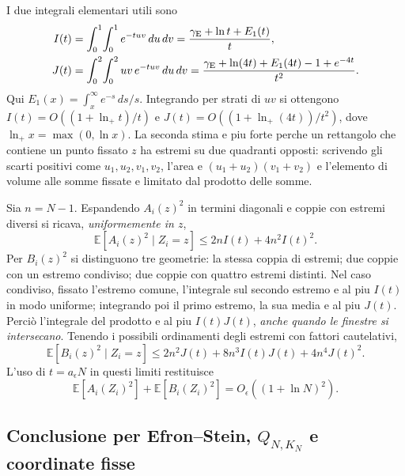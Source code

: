 \documentclass[11pt,a4paper]{article}
\begin{document}
I due integrali elementari utili sono
\begin{align}
 I(t)&=\int_0^1\!\int_0^1e^{-tuv}\,du\,dv
 =\frac{\gamma_{\rm E}+\ln t+E_1(t)}{t},\\
 J(t)&=\int_0^2\!\int_0^2uv\,e^{-tuv}\,du\,dv
 =\frac{\gamma_{\rm E}+\ln(4t)+E_1(4t)-1+e^{-4t}}{t^2}.
 \label{eq:r12ac_integrals}
\end{align}
Qui $E_1(x)=\int_x^\infty e^{-s}\,ds/s$. Integrando per strati di $uv$ si ottengono $I(t)=O((1+\ln_+t)/t)$ e $J(t)=O((1+\ln_+(4t))/t^2)$, dove $\ln_+x=\max(0,\ln x)$. La seconda stima e piu forte perche un rettangolo che contiene un punto fissato $z$ ha estremi su due quadranti opposti: scrivendo gli scarti positivi come $u_1,u_2,v_1,v_2$, l'area e $(u_1+u_2)(v_1+v_2)$ e l'elemento di volume alle somme fissate e limitato dal prodotto delle somme.

Sia $n=N-1$. Espandendo $A_i(z)^2$ in termini diagonali e coppie con estremi diversi si ricava, \emph{uniformemente in $z$},
\begin{equation}
 \mathbb E[A_i(z)^2\mid Z_i=z]\le 2n I(t)+4n^2 I(t)^2.
 \label{eq:r12ac_A_bound}
\end{equation}
Per $B_i(z)^2$ si distinguono tre geometrie: la stessa coppia di estremi; due coppie con un estremo condiviso; due coppie con quattro estremi distinti. Nel caso condiviso, fissato l'estremo comune, l'integrale sul secondo estremo e al piu $I(t)$ in modo uniforme; integrando poi il primo estremo, la sua media e al piu $J(t)$. Perciò l'integrale del prodotto e al piu $I(t)J(t)$, \emph{anche quando le finestre si intersecano}. Tenendo i possibili ordinamenti degli estremi con fattori cautelativi,
\begin{equation}
 \mathbb E[B_i(z)^2\mid Z_i=z]
 \le 2n^2J(t)+8n^3I(t)J(t)+4n^4J(t)^2.
 \label{eq:r12ac_B_bound}
\end{equation}
L'uso di $t=a_\epsilon N$ in questi limiti restituisce
\begin{equation}
 \mathbb E[A_i(Z_i)^2]+\mathbb E[B_i(Z_i)^2]
 =O_\epsilon((1+\ln N)^2).
 \label{eq:r12ac_second_moment}
\end{equation}

\subsection{Conclusione per Efron--Stein, $Q_{N,K_N}$ e coordinate fisse}
\end{document}
